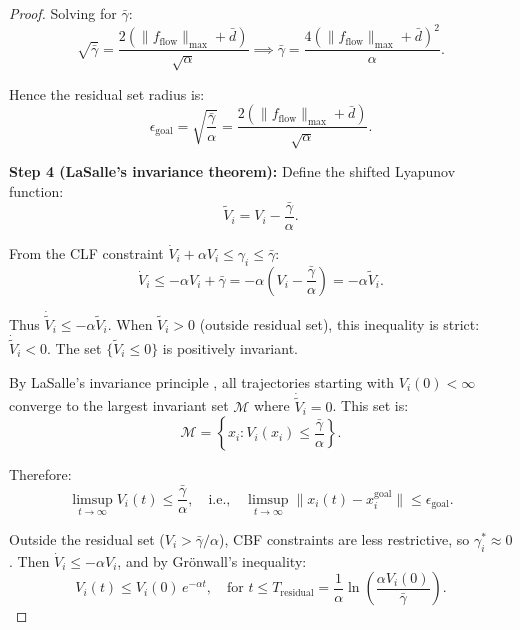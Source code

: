 \documentclass[conference]{IEEEconf}
\theoremstyle{plain}
\begin{document}
\begin{proof}
Solving for $\bar{\gamma}$:
\begin{equation}
\sqrt{\bar{\gamma}} = \frac{2(\|f_{\mathrm{flow}}\|_{\max}+\bar{d})}{\sqrt{\alpha}} \implies \bar{\gamma} = \frac{4(\|f_{\mathrm{flow}}\|_{\max}+\bar{d})^2}{\alpha}.
\label{eq:gamma-solution}
\end{equation}

Hence the residual set radius is:
\begin{equation}
\epsilon_{\mathrm{goal}} = \sqrt{\frac{\bar{\gamma}}{\alpha}} = \frac{2(\|f_{\mathrm{flow}}\|_{\max}+\bar{d})}{\sqrt{\alpha}}.
\label{eq:residual-radius}
\end{equation}

\medskip
\noindent\textbf{Step 4 (LaSalle's invariance theorem):}
Define the shifted Lyapunov function:
\begin{equation}
\tilde{V}_i = V_i - \frac{\bar{\gamma}}{\alpha}.
\label{eq:shifted-lyapunov}
\end{equation}

From the CLF constraint $\dot{V}_i+\alpha V_i\le\gamma_i\le\bar{\gamma}$:
\begin{equation}
\dot{V}_i \le -\alpha V_i + \bar{\gamma} = -\alpha\left(V_i-\frac{\bar{\gamma}}{\alpha}\right) = -\alpha\tilde{V}_i.
\label{eq:shifted-derivative}
\end{equation}

Thus $\dot{\tilde{V}}_i\le -\alpha\tilde{V}_i$. When $\tilde{V}_i>0$ (outside residual set), this inequality is strict: $\dot{\tilde{V}}_i<0$. The set $\{\tilde{V}_i\le 0\}$ is positively invariant.

By LaSalle's invariance principle \cite{khalil2002}, all trajectories starting with $V_i(0)<\infty$ converge to the largest invariant set $\mathcal{M}$ where $\dot{\tilde{V}}_i=0$. This set is:
\begin{equation}
\mathcal{M} = \left\{x_i : V_i(x_i)\le\frac{\bar{\gamma}}{\alpha}\right\}.
\label{eq:invariant-set}
\end{equation}

Therefore:
\begin{equation}
\limsup_{t\to\infty} V_i(t) \le \frac{\bar{\gamma}}{\alpha}, \quad \text{i.e.,} \quad \limsup_{t\to\infty}\|x_i(t)-x_i^{\mathrm{goal}}\| \le \epsilon_{\mathrm{goal}}.
\label{eq:convergence-result}
\end{equation}

Outside the residual set ($V_i>\bar{\gamma}/\alpha$), CBF constraints are less restrictive, so $\gamma_i^*\approx 0$. Then $\dot{V}_i\le -\alpha V_i$, and by Grönwall's inequality:
\begin{equation}
V_i(t) \le V_i(0)\,e^{-\alpha t}, \quad \text{for }t\le T_{\mathrm{residual}}=\frac{1}{\alpha}\ln\left(\frac{\alpha V_i(0)}{\bar{\gamma}}\right).
\label{eq:exponential-convergence}
\end{equation}
\end{proof}
\end{document}
